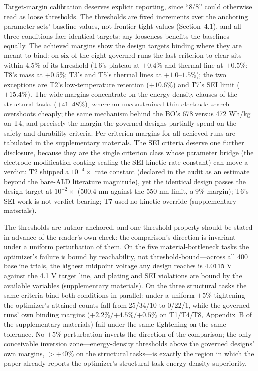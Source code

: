 Target-margin calibration deserves explicit reporting, since ``8/8''
could otherwise read as loose thresholds. The thresholds are fixed
increments over the anchoring parameter sets' baseline values, not
frontier-tight values (Section~4.1), and all three conditions face
identical targets: any looseness benefits the baselines equally. The
achieved margins show the design targets binding where they are meant to bind:
on six of the eight governed runs the last criterion to clear sits within
$4.5\%$ of its threshold (T6's plateau at $+0.4\%$ and thermal line at
$+0.5\%$; T8's mass at $+0.5\%$; T3's and T5's thermal lines at
$+1.0$--$1.5\%$); the two exceptions are T2's low-temperature retention
($+10.6\%$) and T7's SEI limit ($+15.4\%$). The wide margins concentrate
on the energy-density clauses of the structural tasks ($+41$--$48\%$),
where an unconstrained thin-electrode search overshoots cheaply; the same
mechanism behind the BO's 678 versus 472 Wh/kg on T4, and precisely the
margin the governed designs partially spend on the safety and durability
criteria. Per-criterion margins for all achieved runs are tabulated in the
supplementary materials. The SEI criteria deserve one further disclosure,
because they are the single criterion class whose parameter bridge (the
electrode-modification coating scaling the SEI kinetic rate constant) can
move a verdict: T2 shipped a $10^{-4}\times$ rate constant (declared in
the audit as an estimate beyond the bare-ALD literature magnitude), yet the
identical design passes the design target at $10^{-2}\times$ (500.4 nm against
the 550 nm limit, a $9\%$ margin); T6's SEI work is not verdict-bearing;
T7 used no kinetic override (supplementary materials).

The thresholds are author-anchored, and one threshold property should be
stated in advance of the reader's own check: the comparison's direction is
invariant under a uniform perturbation of them. On the five
material-bottleneck tasks the optimizer's failure is bound by reachability, not
threshold-bound---across all 400 baseline trials, the highest midpoint
voltage any design reaches is 4.0115 V against the 4.1 V target line, and
plating and SEI violations are bound by the available variables (supplementary materials). On the
three structural tasks the same criteria bind both conditions in parallel:
under a uniform $+5\%$ tightening the optimizer's attained counts fall from
25/34/10 to 0/22/1, while the governed runs' own binding margins
($+2.2\%$/$+4.5\%$/$+0.5\%$ on T1/T4/T8, Appendix~B of the
supplementary materials) fail
under the same tightening on the same tolerance. No $\pm 5\%$ perturbation
inverts the direction of the comparison; the only conceivable inversion
zone---energy-density thresholds above the governed designs' own margins,
$>+40\%$ on the structural tasks---is exactly the region in which the paper
already reports the optimizer's structural-task energy-density superiority.


